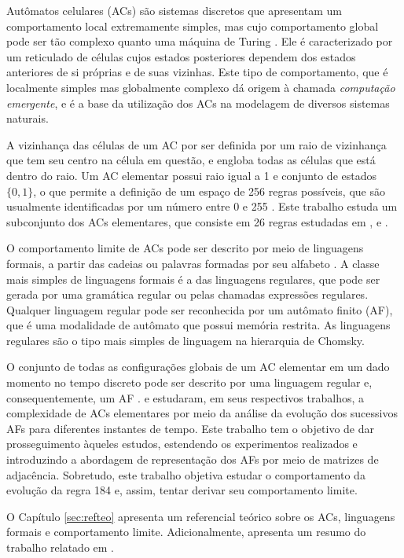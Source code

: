 \documentclass[12pt,a4paper]{article}
\begin{document}
Autômatos celulares (ACs) são sistemas discretos que apresentam um comportamento
local extremamente simples, mas cujo comportamento global pode ser tão
complexo quanto uma máquina de Turing . Ele
é caracterizado por um reticulado de células cujos estados posteriores
dependem dos estados anteriores de si próprias e de suas vizinhas.
Este tipo de comportamento, que é localmente simples mas globalmente
complexo dá origem à chamada \textit{computação emergente}, e é
a base da utilização dos ACs na modelagem de diversos sistemas naturais.

A vizinhança das células de um AC por ser definida por
um raio de vizinhança que tem seu centro na célula em questão, e engloba
todas as células que está dentro do raio. Um AC
elementar possui raio igual a 1 e conjunto de estados $\{0,1\}$, o que
permite a definição de um espaço de 256 regras possíveis, que são
usualmente identificadas por um número entre 0 e 255 .
Este trabalho estuda um subconjunto dos ACs elementares, que consiste
em 26 regras estudadas em ,
 e .

O comportamento limite de ACs pode ser descrito por meio
de linguagens formais, a partir das cadeias ou
palavras formadas por seu alfabeto .
A classe mais simples de linguagens formais é
a das linguagens regulares, que pode ser gerada por uma gramática regular ou
pelas chamadas expressões regulares. Qualquer linguagem regular pode ser
reconhecida por um autômato finito (AF), que é uma modalidade de autômato que
possui memória restrita. As linguagens regulares são o tipo mais simples
de linguagem na hierarquia de Chomsky.

O conjunto de todas as configurações globais de um AC
elementar em um dado momento no tempo discreto pode ser descrito por
uma linguagem regular e, consequentemente, um AF
.  e 
estudaram, em seus respectivos trabalhos, a complexidade de ACs
elementares por meio da análise da evolução dos sucessivos
AFs para diferentes instantes de tempo. Este trabalho
tem o objetivo de dar prosseguimento àqueles estudos, estendendo os
experimentos realizados e introduzindo a abordagem
de representação dos AFs por meio de matrizes de adjacência.
Sobretudo, este trabalho objetiva estudar o comportamento da evolução da
regra 184 e, assim, tentar derivar seu comportamento limite.

O Capítulo \ref{sec:refteo} apresenta um referencial teórico sobre 
os ACs, linguagens formais e comportamento limite.
Adicionalmente, apresenta um resumo do trabalho relatado em
.
\end{document}
